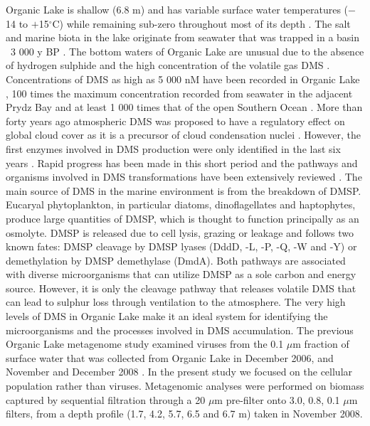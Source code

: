 Organic Lake is shallow (6.8 m) and has variable surface water temperatures ($-$14 to $+$15$^{\circ}$C) while remaining sub-zero throughout most of its depth \cite{Franzman1987b, Gibson1991, Roberts1993, Gibson1999}.
The salt and marine biota in the lake originate from seawater that was trapped in a basin ~3 000 y BP \cite{Zwartz1988, Bird1991}. 
The bottom waters of Organic Lake are unusual due to the absence of hydrogen sulphide and the high concentration of the volatile gas \ac{DMS} \cite{Deprez1986, Franzmann,1987b, Gibson1991, Roberts1993a, Roberts1993b}. 
Concentrations of \ac{DMS} as high as 5 000 nM have been recorded in Organic Lake \cite{Gibson1991}, 100 times the maximum concentration recorded from seawater in the adjacent Prydz Bay and at least 1 000 times that of the open Southern Ocean \cite{Curran1998}.
More than forty years ago atmospheric \ac{DMS} was proposed to have a regulatory effect on global cloud cover as it is a precursor of cloud condensation nuclei \cite{Lovelock1972, Charlson1987}.
However, the first enzymes involved in \ac{DMS} production were only identified in the last six years \cite{Todd2007}.
Rapid progress has been made in this short period and the pathways and organisms involved in \ac{DMS} transformations have been extensively reviewed \cite{Johnston2008, Schafer2010, Curson2011b, Reisch2011b, Moran2012}. 
The main source of \ac{DMS} in the marine environment is from the breakdown of \ac{DMSP}. 
Eucaryal phytoplankton, in particular diatoms, dinoflagellates and haptophytes, produce large quantities of \ac{DMSP}, which is thought to function principally as an osmolyte. 
\ac{DMSP} is released due to cell lysis, grazing or leakage and follows two known fates: \ac{DMSP} cleavage by \ac{DMSP} lyases (DddD, -L, -P, -Q, -W and -Y) or demethylation by \ac{DMSP} demethylase (DmdA).
 Both pathways are associated with diverse microorganisms that can utilize \ac{DMSP} as a sole carbon and energy source. 
However, it is only the cleavage pathway that releases volatile \ac{DMS} that can lead to sulphur loss through ventilation to the atmosphere.
The very high levels of \ac{DMS} in Organic Lake make it an ideal system for identifying the microorganisms and the processes involved in \ac{DMS} accumulation. 
The previous Organic Lake metagenome study examined viruses from the 0.1 $\mu$m fraction of surface water that was collected from Organic Lake in December 2006, and November and December 2008 \cite{Yau2011}. 
In the present study we focused on the cellular population rather than viruses. 
Metagenomic analyses were performed on biomass captured by sequential filtration through a 20 $\mu$m pre-filter onto 3.0, 0.8, 0.1 $\mu$m filters, from a depth profile (1.7, 4.2, 5.7, 6.5 and 6.7 m) taken in November 2008.
